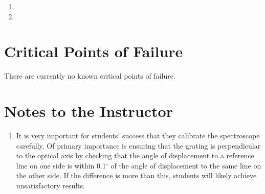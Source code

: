 \begin{enumerate}
\item 
\item 
\end{enumerate}

\section{Critical Points of Failure}

There are currently no known critical points of failure.

\section{Notes to the Instructor}
\begin{enumerate}
\item It is very important for students' success that they calibrate the spectroscope carefully. Of primary importance is ensuring that the grating is perpendicular to the optical axis by checking that the angle of displacement to a reference line on one side is within 0.1$^{\circ}$ of the angle of displacement to the same line on the other side. If the difference is more than this, students will likely achieve unsatisfactory results.
\end{enumerate}

